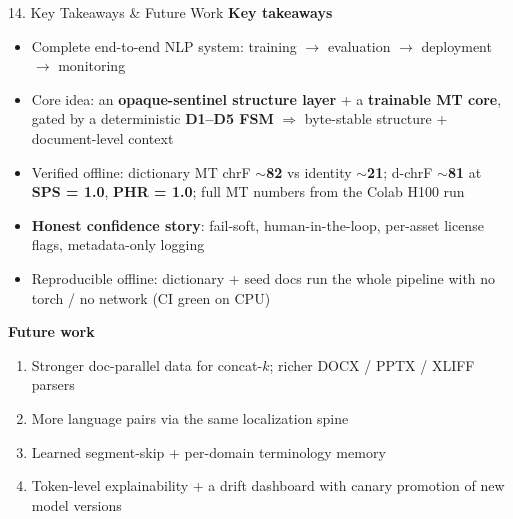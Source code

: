 \documentclass[10pt,aspectratio=169]{beamer}
\begin{document}
\begin{frame}{14. Key Takeaways \& Future Work}
\textbf{Key takeaways}
\begin{itemize}\small
  \item Complete end-to-end NLP system: training $\rightarrow$ evaluation $\rightarrow$ deployment $\rightarrow$ monitoring
  \item Core idea: an \textbf{opaque-sentinel structure layer} + a \textbf{trainable MT core}, gated by a deterministic \textbf{D1--D5 FSM} $\Rightarrow$ byte-stable structure + document-level context
  \item Verified offline: dictionary MT chrF \textbf{$\sim$82} vs identity \textbf{$\sim$21}; d-chrF \textbf{$\sim$81} at \textbf{SPS = 1.0}, \textbf{PHR = 1.0}; full MT numbers from the Colab H100 run
  \item \textbf{Honest confidence story}: fail-soft, human-in-the-loop, per-asset license flags, metadata-only logging
  \item Reproducible offline: dictionary + seed docs run the whole pipeline with no torch / no network (CI green on CPU)
\end{itemize}

\textbf{Future work}
\begin{enumerate}\small
  \item Stronger doc-parallel data for concat-$k$; richer DOCX / PPTX / XLIFF parsers
  \item More language pairs via the same localization spine
  \item Learned segment-skip + per-domain terminology memory
  \item Token-level explainability + a drift dashboard with canary promotion of new model versions
\end{enumerate}
\end{frame}
\end{document}
